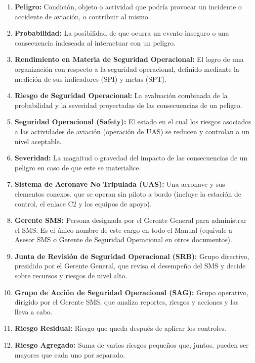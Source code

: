 \begin{enumerate}
    \item \textbf{Peligro:} Condición, objeto o actividad que podría provocar un incidente o accidente de aviación, o contribuir al mismo.

    \item \textbf{Probabilidad:} La posibilidad de que ocurra un evento inseguro o una consecuencia indeseada al interactuar con un peligro.

    \item \textbf{Rendimiento en Materia de Seguridad Operacional:} El logro de una organización con respecto a la seguridad operacional, definido mediante la medición de sus indicadores (SPI) y metas (SPT).

    \item \textbf{Riesgo de Seguridad Operacional:} La evaluación combinada de la probabilidad y la severidad proyectadas de las consecuencias de un peligro.

    \item \textbf{Seguridad Operacional (Safety):} El estado en el cual los riesgos asociados a las actividades de aviación (operación de UAS) se reducen y controlan a un nivel aceptable.

    \item \textbf{Severidad:} La magnitud o gravedad del impacto de las consecuencias de un peligro en caso de que este se materialice.

    \item \textbf{Sistema de Aeronave No Tripulada (UAS):} Una aeronave y sus elementos conexos, que se operan sin piloto a bordo (incluye la estación de control, el enlace C2 y los equipos de apoyo).

    \item \textbf{Gerente SMS:} Persona designada por el Gerente General para administrar el SMS. Es el único nombre de este cargo en todo el Manual (equivale a Asesor SMS o Gerente de Seguridad Operacional en otros documentos).

    \item \textbf{Junta de Revisión de Seguridad Operacional (SRB):} Grupo directivo, presidido por el Gerente General, que revisa el desempeño del SMS y decide sobre recursos y riesgos de nivel alto.

    \item \textbf{Grupo de Acción de Seguridad Operacional (SAG):} Grupo operativo, dirigido por el Gerente SMS, que analiza reportes, riesgos y acciones y las lleva a cabo.

    \item \textbf{Riesgo Residual:} Riesgo que queda después de aplicar los controles.

    \item \textbf{Riesgo Agregado:} Suma de varios riesgos pequeños que, juntos, pueden ser mayores que cada uno por separado.
\end{enumerate}